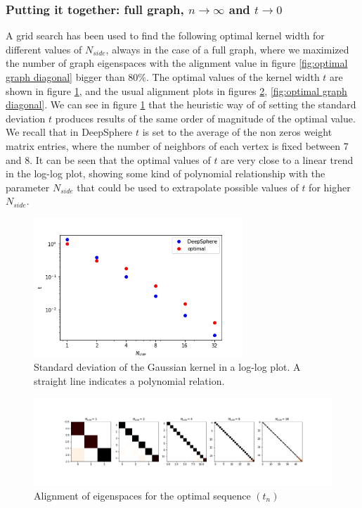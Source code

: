 \subsubsection{Putting it together: full graph, $n\to\infty$ and $t\to 0$}
A grid search has been used to find the following optimal kernel width for different values of $N_{side}$, always in the case of a full graph, where we maximized the number of graph eigenspaces with the alignment value in figure \ref{fig:optimal graph diagonal} bigger than $80\%$. The optimal values of the kernel width $t$ are shown in figure \ref{fig:t}, and the usual alignment plots in figures \ref{fig:optimal graph}, \ref{fig:optimal graph diagonal}. We can see in figure \ref{fig:t} that the heuristic way of \cite{DeepSphere} of setting the standard deviation $t$ produces results of the same order of magnitude of the optimal value. We recall that in DeepSphere $t$ is set to the average of the non zeros weight matrix entries, where the number of neighbors of each vertex is fixed between 7 and 8. It can be seen that the optimal values of $t$ are very close to a linear trend in the log-log plot, showing some kind of polynomial relationship with the parameter $N_{side}$ that could be used to extrapolate possible values of $t$ for higher $N_{side}$.
\begin{figure}[h]
	\centering
	\includegraphics[width=0.7\textwidth]{../codes/02.HeatKernelGraphLaplacian/HEALPix/06_figures/kernelwidth.png}
\caption{\label{fig:t}Standard deviation of the Gaussian kernel  in a log-log plot. A straight line indicates a polynomial relation.}
\end{figure}
\begin{figure}[h]
	\centering
	\includegraphics[width=\textwidth]{../codes/02.HeatKernelGraphLaplacian/HEALPix/06_figures/optimal_full.png}	
\caption{\label{fig:optimal graph}Alignment of eigenspaces for the optimal sequence $(t_n)$}
\end{figure}

